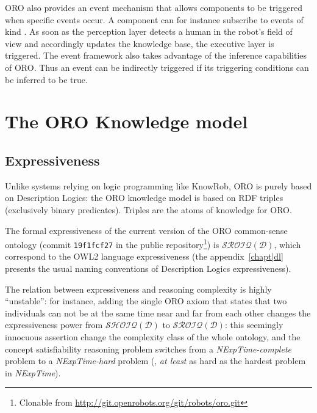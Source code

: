 ORO also provides an event mechanism that allows components to be triggered
when specific events occur. A component can for instance subscribe to events
of kind . As soon as the
perception layer detects a human in the robot's field of view and accordingly
updates the knowledge base, the executive layer is triggered. The event
framework also takes advantage of the inference capabilities of ORO. Thus an
event can be indirectly triggered if its triggering conditions can be
inferred to be true.




\section{The ORO Knowledge model}
\label{sect|knowledge-model}

\subsection{Expressiveness}

Unlike systems relying on logic programming like {\sc KnowRob}, ORO is purely
based on Description Logics: the ORO knowledge model is based on RDF triples
(\ie exclusively binary predicates). Triples 
are the atoms of knowledge for ORO.

The formal expressiveness of the current version of the ORO common-sense
ontology (commit {\tt 19f1fcf27} in the public repository\footnote{Clonable
from \url{http://git.openrobots.org/git/robots/oro.git}}) is
$\mathcal{SROIQ(D)}$, which correspond to the OWL2 language expressiveness (the
appendix~\ref{chapt|dl} presents the usual naming conventions of Description
Logics expressiveness).

The relation between expressiveness and reasoning complexity is highly
``unstable'': for instance, adding  the single ORO axiom  that states that two individuals can not be at the same
time near and far from each other changes the expressiveness power from
$\mathcal{SHOIQ(D)}$ to $\mathcal{SROIQ(D)}$: this seemingly  innocuous
assertion change the complexity class of the whole ontology, and the concept
satisfiability reasoning problem switches from a {\it NExpTime-complete}
problem to a {\it NExpTime-hard} problem (\ie, \emph{at least} as hard as the
hardest problem in {\it NExpTime}).

